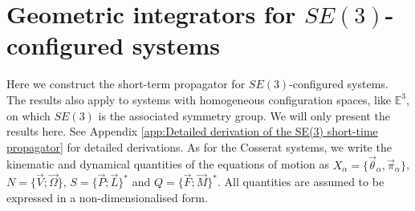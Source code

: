 \section{Geometric integrators for $SE(3)$-configured systems} \label{sec:Geometric integrators for SE(3)-valued configuration spaces}

Here we construct the short-term propagator for $SE(3)$-configured systems. The results also apply to systems with homogeneous configuration spaces, like $\mathbb{E}^3$, on which $SE(3)$ is the associated symmetry group. We will only present the results here. See Appendix \ref{app:Detailed derivation of the SE(3) short-time propagator} for detailed derivations. As for the Cosserat systems, we write the kinematic and dynamical quantities of the equations of motion as $X_\alpha = \{ \vec{\theta}_\alpha, \vec{\pi}_\alpha \}$, $N = \{ \vec{V} ; \vec{\Omega} \}$, $S = \{ \vec{P} ; \vec{L} \}^*$ and $Q = \{ \vec{F} ; \vec{M} \}^*$. All quantities are assumed to be expressed in a non-dimensionalised form.

